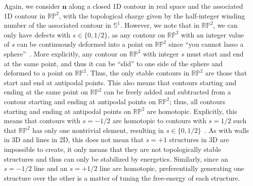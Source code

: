 Again, we consider $\mathbf{n}$ along a closed 1D contour in real space and the associated 1D contour in $\mathbb{R}\mathbb{P}^2$, with the topological charge given by the half-integer winding number of the associated contour in $\mathbb{S}^1$.
However, we note that in $\mathbb{R}\mathbb{P}^2$, we can only have defects with $s \in \{0,1/2\}$, as any contour on $\mathbb{R}\mathbb{P}^2$ with an integer value of $s$ can be continuously deformed into a point on $\mathbb{R}\mathbb{P}^2$ since ``you cannot lasso a sphere''~\cite{RN153}.
More explicitly, any contour on  $\mathbb{R}\mathbb{P}^2$ with integer $s$ must start and end at the same point, and thus it can be ``slid'' to one side of the sphere and deformed to a point on $\mathbb{R}\mathbb{P}^2$.
Thus, the only stable contours in $\mathbb{R}\mathbb{P}^2$ are those that start and end at antipodal points.
This also means that contours starting and ending at the same point on $\mathbb{R}\mathbb{P}^2$ can be freely added and subtracted from a contour starting and ending at antipodal points on $\mathbb{R}\mathbb{P}^2$; thus, all contours starting and ending at antipodal points on $\mathbb{R}\mathbb{P}^2$ are homotopic.
Explicitly, this means that contours with $s = -1/2$ are homotopic to contours with $s = 1/2$ such that $\mathbb{R}\mathbb{P}^2$ has only one nontrivial element, resulting in $s \in \{ 0,1/2\}$~\cite{RN153}.
As with walls in 3D and lines in 2D, this does not mean that $s = +1$ structures in 3D are impossible to create, it only means that they are not topologically stable structures and thus can only be stabilized by energetics.
Similarly, since an $s = -1/2$ line and an $s = +1/2$ line are homotopic, preferentially generating one structure over the other is a matter of tuning the free-energy of each structure.\\

